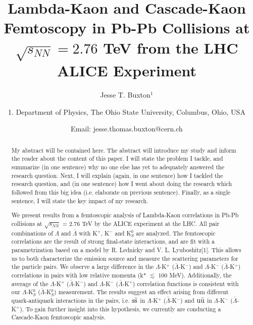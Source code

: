 \documentclass[ALICE,manyauthors]{ALICE_analysis_notes}
\begin{document}
%
%
%
\begin{titlepage}
%
\PHdate{\today}
%
\title{Lambda-Kaon and Cascade-Kaon Femtoscopy in Pb-Pb Collisions at $\sqrt{s_{NN}}=2.76$ TeV from the LHC ALICE Experiment}
%
\author{Jesse T. Buxton$^{1}$}
\author{
1. Department of Physics, The Ohio State University, Columbus, Ohio, USA\\
}
\author{Email: jesse.thomas.buxton@cern.ch}
%
%
\begin{abstract}
My abstract will be contained here.  The abstract will introduce my study and inform the reader about the content of this paper.  I will state the problem I tackle, and summarize (in one sentence) why no one else has yet to adequately answered the research question.  Next, I will explain (again, in one sentence) how I tackled the research question, and (in one sentence) how I went about doing the research which followed from this big idea (i.e. elaborate on previous sentence).  Finally, as a single sentence, I will state the key impact of my research.

We present results from a femtoscopic analysis of Lambda-Kaon correlations in Pb-Pb collisions at $\sqrt{s_{NN}}$ = 2.76 TeV by the ALICE experiment at the LHC.  
All pair combinations of $\Lambda$ and $\bar{\Lambda}$ with K$^{+}$, K$^{-}$ and K$^{0}_{S}$ are analyzed.  
The femtoscopic correlations are the result of strong final-state interactions, and are fit with a parametrization based on a model by R. Lednicky and V. L. Lyuboshitz[1].  
This allows us to both characterize the emission source and measure the scattering parameters for the particle pairs.  
We observe a large difference in the $\Lambda$-K$^{+}$ ($\bar{\Lambda}$-K$^{-}$) and $\Lambda$-K$^{-}$ ($\bar{\Lambda}$-K$^{+}$) correlations in pairs with low relative momenta (k* $\lesssim$ 100 MeV).  
Additionally, the average of the $\Lambda$-K$^{+}$ ($\bar{\Lambda}$-K$^{-}$) and $\Lambda$-K$^{-}$ ($\bar{\Lambda}$-K$^{+}$) correlation functions is consistent with our $\Lambda$-K$^{0}_{S}$ ($\bar{\Lambda}$-K$^{0}_{S}$) measurement.  
The results suggest an effect arising from different quark-antiquark interactions in the pairs, i.e. $\rm s\bar{s}$ in $\Lambda$-K$^{+}$ ($\bar{\Lambda}$-K$^{-}$) and $\rm u\bar{u}$ in $\Lambda$-K$^{-}$ ($\bar{\Lambda}$-K$^{+}$).  
To gain further insight into this hypothesis, we currently are conducting a Cascade-Kaon femtoscopic analysis.
\end{abstract}
\end{titlepage}
%
%

\end{document}
